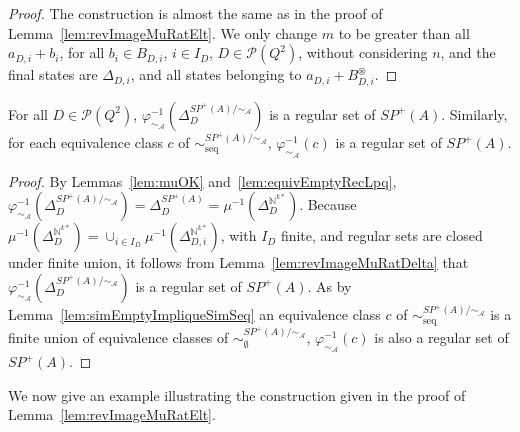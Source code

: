 \documentclass{CSML}
\begin{document}
\begin{proof}
  The construction is almost the same as in the proof of Lemma~\ref{lem:revImageMuRatElt}.
  We only change $m$ to be greater than all $a_{D,i}+b_i$, for all $b_i\in B_{D,i}$, $i\in I_D$, $D\in\mathcal{P}(Q^2)$, without considering $n$, and the final states are $\Delta_{D,i}$, and all states belonging to $a_{D,i}+B_{D,i}^\circledast$.
\end{proof}

\begin{lem}
  \label{lem:revImageVarphiClasse}
  For all $D\in\mathcal{P}(Q^2)$, $\varphi^{-1}_{\sim_\mathcal{A}}(\Delta_D^{SP^+(A)/\mathord\sim_\mathcal{A}})$ is a regular set of $SP^+(A)$. Similarly, for each equivalence class $c$ of $\sim_\text{seq}^{SP^+(A)/\mathord\sim_\mathcal{A}}$, $\varphi^{-1}_{\sim_\mathcal{A}}(c)$ is a regular set of $SP^+(A)$.
\end{lem}

\begin{proof}
  By Lemmas~\ref{lem:muOK} and~\ref{lem:equivEmptyRecLpq}, $\varphi^{-1}_{\sim_\mathcal{A}}(\Delta_D^{SP^+(A)/\mathord\sim_\mathcal{A}})=\Delta_D^{SP^+(A)}=\mu^{-1}(\Delta_D^{\mathbb{N}^{k*}})$.
  Because $\mu^{-1}(\Delta_D^{\mathbb{N}^{k*}})=\cup_{i\in I_D}\mu^{-1}(\Delta_{D,i}^{\mathbb{N}^{k*}})$, with $I_D$ finite, and regular sets are closed under finite union, it follows from Lemma~\ref{lem:revImageMuRatDelta} that  $\varphi^{-1}_{\sim_\mathcal{A}}(\Delta_D^{SP^+(A)/\mathord\sim_\mathcal{A}})$ is a regular set of $SP^+(A)$. As by Lemma~\ref{lem:simEmptyImpliqueSimSeq} an equivalence class $c$ of $\sim_\text{seq}^{SP^+(A)/\mathord\sim_\mathcal{A}}$ is a finite union of equivalence classes of $\sim_\emptyset^{SP^+(A)/\mathord\sim_\mathcal{A}}$,  $\varphi^{-1}_{\sim_\mathcal{A}}(c)$ is also a regular set of $SP^+(A)$.
\end{proof}

We now give an example illustrating the construction given in the proof of Lemma~\ref{lem:revImageMuRatElt}.
\end{document}
